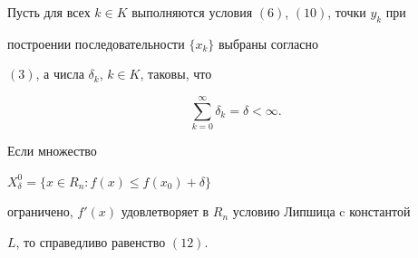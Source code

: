 \begin{thm}


Пусть для всех $k\in K$ выполняются условия $(6)$, $(10)$, точки $y_k$ при


построении последовательности $\{x_k\} $ выбраны согласно


$(3)$, а числа $\delta_k$, $k\in K$, таковы, что


\begin{equation}


\sum_{k=0}^\infty \delta_k=\delta <\infty.


\end{equation}


Если множество


$X^0_\delta=\{x\in R_n:f(x)\leq f(x_0)+\delta\}$


ограничено, $f'(x)$ удовлетворяет в $R_n$ условию Липшица c константой


$L$, то справедливо равенство $(12)$.


\end{thm}





